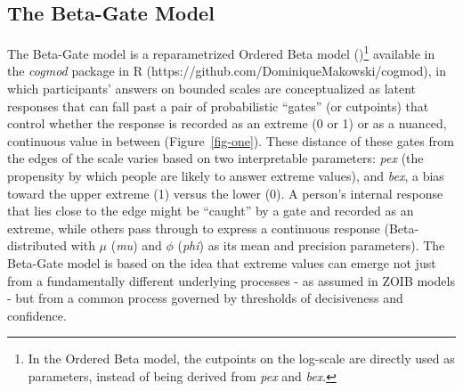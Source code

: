 \documentclass[
  jou,
  floatsintext,
  longtable,
  nolmodern,
  notxfonts,
  notimes,
  colorlinks=true,linkcolor=blue,citecolor=blue,urlcolor=blue]{apa7}
\begin{document}
\subsection{The Beta-Gate Model}\label{the-beta-gate-model}

The Beta-Gate model is a reparametrized Ordered Beta model
()\footnote{In the
  Ordered Beta model, the cutpoints on the log-scale are directly used
  as parameters, instead of being derived from \emph{pex} and
  \emph{bex}.} available in the \emph{cogmod} package in R
(https://github.com/DominiqueMakowski/cogmod), in which participants'
answers on bounded scales are conceptualized as latent responses that
can fall past a pair of probabilistic ``gates'' (or cutpoints) that
control whether the response is recorded as an extreme (0 or 1) or as a
nuanced, continuous value in between (Figure~\ref{fig-one}). These
distance of these gates from the edges of the scale varies based on two
interpretable parameters: \emph{pex} (the propensity by which people are
likely to answer extreme values), and \emph{bex}, a bias toward the
upper extreme (1) versus the lower (0). A person's internal response
that lies close to the edge might be ``caught'' by a gate and recorded
as an extreme, while others pass through to express a continuous
response (Beta-distributed with \(\mu\) (\emph{mu}) and \(\phi\)
(\emph{phi}) as its mean and precision parameters). The Beta-Gate model
is based on the idea that extreme values can emerge not just from a
fundamentally different underlying processes - as assumed in ZOIB models
- but from a common process governed by thresholds of decisiveness and
confidence.
\end{document}
